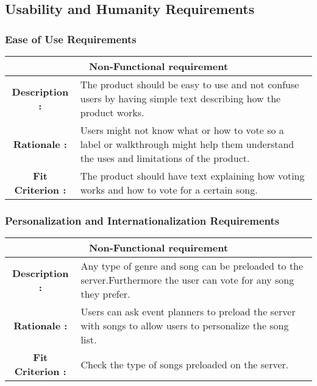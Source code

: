 \documentclass[12pt, titlepage]{article}
\begin{document}
\subsection{Usability and Humanity Requirements}

\subsubsection{Ease of Use Requirements}

\begin{center}
\begin{table}[H]
\begin{tabularx}{\textwidth}{| c X |}
\hline
\multicolumn{2}{|c|}{\textbf{Non-Functional requirement}}\\
\hline
\textbf{Description : } & The product should be easy to use and not confuse users by having simple text describing how the product works.\\
\hline
\textbf{Rationale : } & Users might not know what or how to vote so a label or walkthrough might help them understand the uses and limitations of the product.\\
\hline
\textbf{Fit Criterion : } &  The product should have text explaining how voting works and how to vote for a certain song.\\
\hline
\end{tabularx}
\end{table}
\end{center}

\subsubsection{Personalization and Internationalization Requirements}

\begin{center}
\begin{table}[H]
\begin{tabularx}{\textwidth}{| c X |}
\hline
\multicolumn{2}{|c|}{\textbf{Non-Functional requirement}}\\
\hline
\textbf{Description : } & Any type of genre and song can be preloaded to the server.Furthermore the user can vote for any song they prefer.\\
\hline
\textbf{Rationale : } &  Users can ask event planners to preload the server with songs to allow users to personalize the song list.\\
\hline
\textbf{Fit Criterion : } &   Check the type of songs preloaded on the server.\\
\hline
\end{tabularx}
\end{table}
\end{center}
\end{document}
